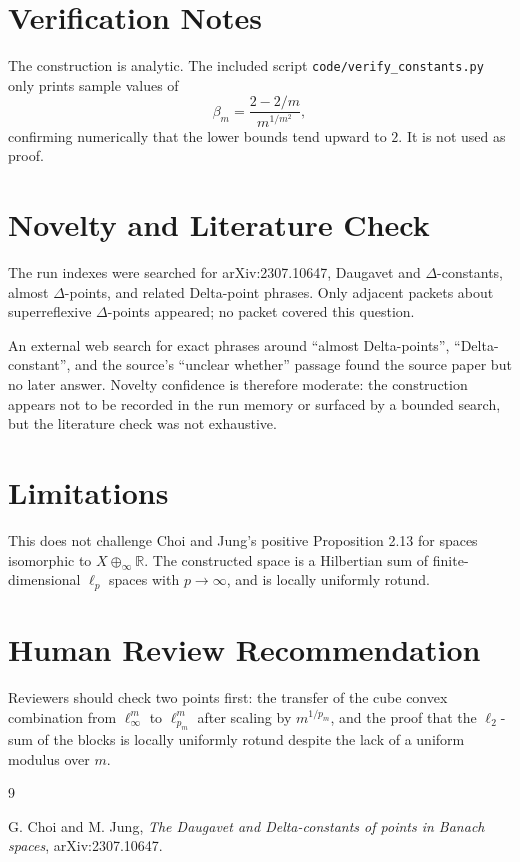\documentclass[11pt]{article}
\begin{document}
\section*{Verification Notes}

The construction is analytic.  The included script
\texttt{code/verify\_constants.py} only prints sample values of
\[
  \beta_m=\frac{2-2/m}{m^{1/m^2}},
\]
confirming numerically that the lower bounds tend upward to \(2\).  It is not
used as proof.

\section*{Novelty and Literature Check}

The run indexes were searched for arXiv:2307.10647, Daugavet and
\(\Delta\)-constants, almost \(\Delta\)-points, and related Delta-point phrases.
Only adjacent packets about superreflexive \(\Delta\)-points appeared; no packet
covered this question.

An external web search for exact phrases around ``almost Delta-points'',
``Delta-constant'', and the source's ``unclear whether'' passage found the
source paper but no later answer.  Novelty confidence is therefore moderate:
the construction appears not to be recorded in the run memory or surfaced by a
bounded search, but the literature check was not exhaustive.

\section*{Limitations}

This does not challenge Choi and Jung's positive Proposition 2.13 for spaces
isomorphic to \(X\oplus_\infty\mathbb R\).  The constructed space is a
Hilbertian sum of finite-dimensional \(\ell_p\) spaces with \(p\to\infty\), and
is locally uniformly rotund.

\section*{Human Review Recommendation}

Reviewers should check two points first: the transfer of the cube convex
combination from \(\ell_\infty^m\) to \(\ell_{p_m}^m\) after scaling by
\(m^{1/p_m}\), and the proof that the \(\ell_2\)-sum of the blocks is locally
uniformly rotund despite the lack of a uniform modulus over \(m\).

\begin{thebibliography}{9}

G. Choi and M. Jung,
\emph{The Daugavet and Delta-constants of points in Banach spaces},
arXiv:2307.10647.

\end{thebibliography}
\end{document}
